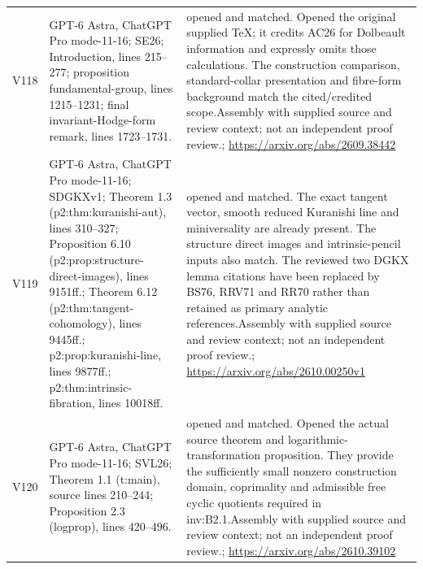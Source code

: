 \begin{longtable}{@{}L{.08\linewidth}L{.31\linewidth}L{.56\linewidth}@{}}
V118 & GPT-6 Astra, ChatGPT Pro mode-11-16; S\newline E26; Introduction, lines 215--277; proposition fundamental-group, lines 1215--1231; final invariant-Hodge-form remark, lines 1723--1731. & opened and matched. Opened the original supplied TeX; it credits AC26 for Dolbeault information and expressly omits those calculations. The construction comparison, standard-collar presentation and fibre-form background match the cited/\allowbreak{}credited scope.\newline Assembly with supplied source and review context; not an independent proof review.\newline {}; \url{https://arxiv.org/abs/2609.38442}\\
V119 & GPT-6 Astra, ChatGPT Pro mode-11-16; S\newline DGKXv1; Theorem 1.3 (p2:\allowbreak{}thm:\allowbreak{}kuranishi-aut), lines 310--327; Proposition 6.10 (p2:\allowbreak{}prop:\allowbreak{}structure-direct-images), lines 9151ff.; Theorem 6.12 (p2:\allowbreak{}thm:\allowbreak{}tangent-cohomology), lines 9445ff.; p2:\allowbreak{}prop:\allowbreak{}kuranishi-line, lines 9877ff.; p2:\allowbreak{}thm:\allowbreak{}intrinsic-fibration, lines 10018ff. & opened and matched. The exact tangent vector, smooth reduced Kuranishi line and miniversality are already present. The structure direct images and intrinsic-pencil inputs also match. The reviewed two DGKX lemma citations have been replaced by BS76, RRV71 and RR70 rather than retained as primary analytic references.\newline Assembly with supplied source and review context; not an independent proof review.\newline {}; \url{https://arxiv.org/abs/2610.00250v1}\\
V120 & GPT-6 Astra, ChatGPT Pro mode-11-16; S\newline VL26; Theorem 1.1 (t:\allowbreak{}main), source lines 210--244; Proposition 2.3 (logprop), lines 420--496. & opened and matched. Opened the actual source theorem and logarithmic-transformation proposition. They provide the sufficiently small nonzero construction domain, coprimality and admissible free cyclic quotients required in inv:\allowbreak{}B2.1.\newline Assembly with supplied source and review context; not an independent proof review.\newline {}; \url{https://arxiv.org/abs/2610.39102}\\

\end{longtable}
